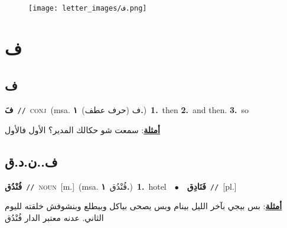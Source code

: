 \documentclass[10pt,a4paper,twoside]{article} %
\begin{document}
\begin{figure*}[t!]\centering\texttt{[image: letter\_images/ف.png]}\end{figure*}
\color{white}

 \section*{\foreignlanguage{arabic}{ف}} 
 \begin{multicols}{2} 

%
\color{black}
\vspace{-3mm}
\subsection*{\color{blue}\foreignlanguage{arabic}{ف}\color{blue}{ (ntws)}} 

{\setlength\topsep{0pt}\textbf{\foreignlanguage{arabic}{فَ}}\ {\color{gray}\texttt{//}\color{black}}\ \textsc{conj}\ \color{gray}(msa. \foreignlanguage{arabic}{ف (حرف عطف)}~\foreignlanguage{arabic}{\textbf{١.}})\color{black}\ \textbf{1.}~then  \textbf{2.}~and then.  \textbf{3.}~so\  \begin{flushright}\color{gray}\foreignlanguage{arabic}{\textbf{\underline{\foreignlanguage{arabic}{أمثلة}}}: سمعت شو حكالك المدير؟ الأول فالأول}\end{flushright}\color{black}} \vspace{2mm}

\vspace{-3mm}
\subsection*{\color{blue}\foreignlanguage{arabic}{ف..ن.د.ق}\color{blue}{ (ntws)}} 

{\setlength\topsep{0pt}\textbf{\foreignlanguage{arabic}{فُنْدُق}}\ {\color{gray}\texttt{//}\color{black}}\ \textsc{noun}\ [m.]\ \color{gray}(msa. \foreignlanguage{arabic}{فُنْدُق}~\foreignlanguage{arabic}{\textbf{١.}})\color{black}\ \textbf{1.}~hotel\ \ $\bullet$\ \ \setlength\topsep{0pt}\textbf{\foreignlanguage{arabic}{فَنَادِق}}\ {\color{gray}\texttt{//}\color{black}}\ [pl.]\  \begin{flushright}\color{gray}\foreignlanguage{arabic}{\textbf{\underline{\foreignlanguage{arabic}{أمثلة}}}: بس بيجي بآخر الليل بينام وبس يصحى بياكل وبيطلع وبنشوفش خلقته لليوم الثاني. عدنه معتبر الدار فُنْدُق}\end{flushright}\color{black}} \vspace{2mm}


\end{multicols}
\end{document}
